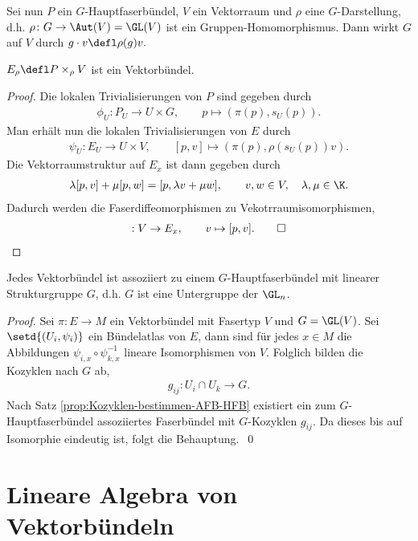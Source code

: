 \documentclass[%
	paper=a5,%
	fleqn,%
	DIV=18,%
	BCOR=0mm,
	fontsize=11pt,
	titlepage=false,%
	bibliography=totoc,
	DIV=18,%
	twoside=true,
	pdftitle=Riemannsche Geometrie,
	pdfauthor=Uwe Semmelmann,
	numbers=noendperiod]%
	{scrbook}
\begin{document}
Sei nun $P$ ein $G$-Hauptfaserbündel, $V$ ein Vektorraum und $\rho$
eine $G$-Darstellung, d.h.
$
\rho\colon G\to \Aut(V)=\GL(V)
$
ist ein Gruppen-Homomorphismus. Dann wirkt $G$ auf $V$ durch
$
g\cdot v \defl \rho(g)v.
$

\begin{lem}
$E_\rho\defl P\times_\rho V$ ist ein Vektorbündel.\fish
\end{lem}

\begin{proof}
Die lokalen Trivialisierungen von $P$ sind gegeben durch
\begin{align*}
\phi_U : P_U\to U\times G,\qquad p\mapsto (\pi(p),s_U(p)).
\end{align*}
Man erhält nun die lokalen Trivialisierungen von $E$ durch
\begin{align*}
\psi_U : E_U \to U\times V,\qquad
[p,v]\mapsto (\pi(p),\rho(s_U(p))v).
\end{align*}
Die Vektorraumstruktur auf $E_x$ ist dann gegeben durch
\begin{align*}
\lambda[p,v]+\mu[p,w] = [p,\lambda v + \mu w],\qquad
v,w\in V,\quad \lambda,\mu\in\K.
\end{align*}
Dadurch werden die Faserdiffeomorphismen zu Vekotrraumisomorphismen,
\begin{align*}
[p]: V\to E_x,\qquad v\mapsto [p,v].\qed
\end{align*}
\end{proof}

\begin{lem}
\label{lem:VB-assoziert-GLn}
Jedes Vektorbündel ist assoziiert zu einem $G$-Hauptfaserbündel mit linearer
Strukturgruppe $G$, d.h. $G$ ist eine Untergruppe der $\GL_n$.\fish
\end{lem}
\begin{proof}
Sei $\pi\colon E\to M$ ein Vektorbündel mit Fasertyp $V$ und $G=\GL(V)$. Sei
$\setd{(U_i,\psi_i)}$ ein Bündelatlas von $E$, dann sind für jedes $x\in M$ die
Abbildungen $\psi_{i,x}\circ\psi_{k,x}^{-1}$ lineare Isomorphismen von $V$.
Folglich bilden die Kozyklen nach $G$ ab,
\begin{align*}
g_{ij}\colon U_i\cap U_k \to G.
\end{align*}
Nach Satz \ref{prop:Kozyklen-bestimmen-AFB-HFB} existiert ein zum $G$-Hauptfaserbündel
assoziiertes Faserbündel mit $G$-Kozyklen $g_{ij}$. Da dieses bis auf Isomorphie
eindeutig ist, folgt die Behauptung.~\qed
\end{proof}

\section{Lineare Algebra von Vektorbündeln}
\end{document}
